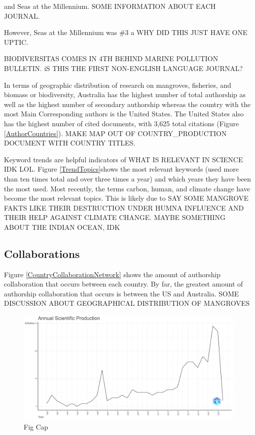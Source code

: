 \documentclass[
  12pt,
]{article}
\begin{document}
and Seas at the Millennium. SOME INFORMATION ABOUT EACH JOURNAL.

However, Seas at the Millennium was \#3 a WHY DID THIS JUST HAVE ONE UPTIC.

BIODIVERSITAS COMES IN 4TH BEHIND MARINE POLLUTION BULLETIN. iS THIS THE FIRST NON-ENGLISH LANGUAGE JOURNAL?

In terms of geographic distribution of research on mangroves, fisheries, and biomass or biodiversity, Australia has the highest number of total authorship as well as the highest number of secondary authorship whereas the country with the most Main Corresponding authors is the United States. The United States also has the highest number of cited documents, with 3,625 total citations (Figure \ref{AuthorCountries}). MAKE MAP OUT OF COUNTRY\_PRODUCTION DOCUMENT WITH COUNTRY TITLES.

Keyword trends are helpful indicators of WHAT IS RELEVANT IN SCIENCE IDK LOL. Figure \ref{TrendTopics}shows the most relevant keywords (used more than ten times total and over three times a year) and which years they have been the most used. Most recently, the terms carbon, human, and climate change have become the most relevant topics. This is likely due to SAY SOME MANGROVE FAKTS LIKE THEIR DESTRUCTION UNDER HUMNA INFLUENCE AND THEIR HELP AGAINST CLIMATE CHANGE. MAYBE SOMETHING ABOUT THE INDIAN OCEAN, IDK

\hypertarget{collaborations}{%
\subsection{Collaborations}\label{collaborations}}

Figure \ref{CountryCollaborationNetwork} shows the amount of authorship collaboration that occurs between each country. By far, the greatest amount of authorship collaboration that occurs is between the US and Australia. SOME DISCUSSION ABOUT GEOGRAPHICAL DISTRIBUTION OF MANGROVES

\begin{figure}
\includegraphics[width=1\linewidth]{AnnualScientificProduction} \caption{Fig Cap \label{AnnualScientificProduction}}\label{fig:AnnualScientificProduction}
\end{figure}
\end{document}
